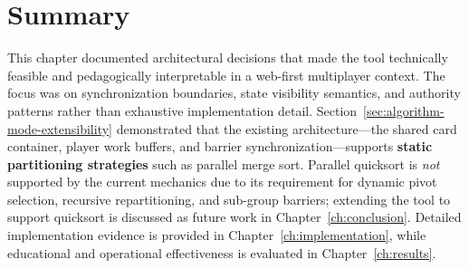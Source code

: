 \section{Summary}
\label{sec:architecture-summary}

This chapter documented architectural decisions that made the tool technically feasible and pedagogically interpretable in a web-first multiplayer context. The focus was on synchronization boundaries, state visibility semantics, and authority patterns rather than exhaustive implementation detail. Section~\ref{sec:algorithm-mode-extensibility} demonstrated that the existing architecture---the shared card container, player work buffers, and barrier synchronization---supports \textbf{static partitioning strategies} such as parallel merge sort. Parallel quicksort is \emph{not} supported by the current mechanics due to its requirement for dynamic pivot selection, recursive repartitioning, and sub-group barriers; extending the tool to support quicksort is discussed as future work in Chapter~\ref{ch:conclusion}. Detailed implementation evidence is provided in Chapter~\ref{ch:implementation}, while educational and operational effectiveness is evaluated in Chapter~\ref{ch:results}.
